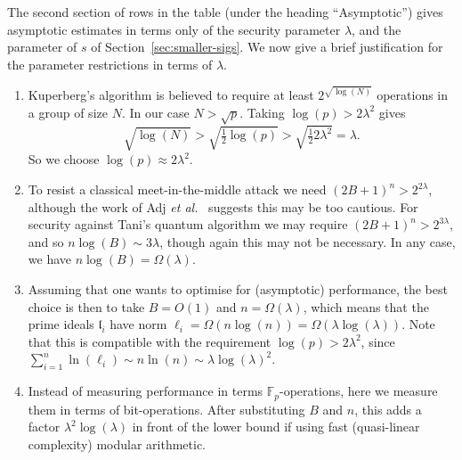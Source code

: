 \documentclass{llncs}
\newcommand{\F}{\mathbb{F}}
\renewcommand{\l}{\mathfrak{l}}
\begin{document}
The second section of rows in the table (under the heading ``Asymptotic'') gives asymptotic estimates in terms only of the security parameter $\lambda$, and the parameter of $s$ of Section~\ref{sec:smaller-sigs}.
We now give a brief justification for the parameter restrictions in terms of $\lambda$.
\begin{enumerate}
\item Kuperberg's algorithm is believed to require at least $ 2^{\sqrt{\log(N)}}$ operations in a group of size $N$. In our case $N > \sqrt{p}$. Taking $\log(p) > 2 \lambda^2$ gives 
\[
   \sqrt{ \log(N)} > \sqrt{ \tfrac{1}{2} \log(p) } > \sqrt{ \tfrac{1}{2} 2 \lambda^2 } = \lambda.
\]
So we choose $\log(p) \approx 2 \lambda^2$.

\item 
To resist a classical meet-in-the-middle attack we need $(2B+1)^n > 2^{2 \lambda}$, although the work of Adj \emph{et al.}~\cite{adj+menezes+al-isogenies} suggests this may be too cautious.
For security against Tani's quantum algorithm we may require $(2B+1)^n > 2^{3 \lambda}$, and so $n \log(B) \sim 3 \lambda$, though again this may not be necessary. In any case, we have $n \log(B) = \Omega( \lambda )$.



%

\item Assuming that one wants to optimise for (asymptotic) performance, the best choice is then to take $B=O(1)$ and $n=\Omega(\lambda)$, which means that the prime ideals $\l_i$ have norm $\ell_i = \Omega( n \log(n)) =  \Omega( \lambda \log(\lambda))$. Note that this is compatible with the requirement $\log(p)>2\lambda^2$, since $\sum_{i=1}^n\ln(\ell_i)\sim n\ln(n) \sim \lambda\log(\lambda)^2$.

\item Instead of measuring performance in terms $\F_p$-operations, here we measure them in terms of bit-operations. After substituting $B$ and $n$, this adds a factor $\lambda^2\log(\lambda)$ in front of the lower bound if using fast (quasi-linear complexity) modular arithmetic.

\end{enumerate}
\end{document}
